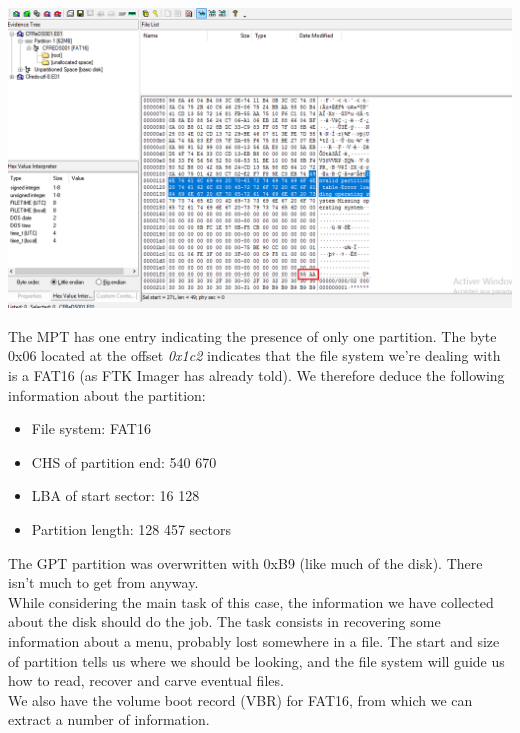 \documentclass[
	12pt, %
]{fphw}
\begin{document}
\begin{center}
	\includegraphics[width=0.9\columnwidth]{fig1.png}
	\label{fig:fig1}
\end{center}
\vspace{2mm}

The MPT has one entry indicating the presence of only one partition. The byte 0x06 located at the
offset \textit{0x1c2} indicates that the file system we’re dealing with is a FAT16 (as FTK Imager has already
told). We therefore deduce the following information about the partition:

\begin{itemize}
	\item File system: FAT16
	\item CHS of partition end: 540 670
	\item LBA of start sector: 16 128
	\item Partition length: 128 457 sectors\\
\end{itemize}

The GPT partition was overwritten with 0xB9 (like much of the disk). There isn’t much to get from
anyway.\\

While considering the main task of this case, the information we have collected about the disk should
do the job. The task consists in recovering some information about a menu, probably lost somewhere
in a file. The start and size of partition tells us where we should be looking, and the file system will
guide us how to read, recover and carve eventual files.\\

We also have the volume boot record (VBR) for FAT16, from which we can extract a number of
information.
\end{document}
